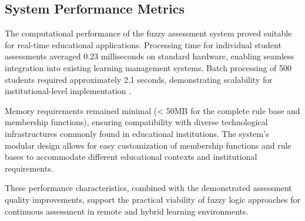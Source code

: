\subsection{System Performance Metrics}

The computational performance of the fuzzy assessment system proved suitable for real-time educational applications. Processing time for individual student assessments averaged 0.23 milliseconds on standard hardware, enabling seamless integration into existing learning management systems. Batch processing of 500 students required approximately 2.1 seconds, demonstrating scalability for institutional-level implementation \cite{Garcia2024}.

Memory requirements remained minimal (< 50MB for the complete rule base and membership functions), ensuring compatibility with diverse technological infrastructures commonly found in educational institutions. The system's modular design allows for easy customization of membership functions and rule bases to accommodate different educational contexts and institutional requirements.

These performance characteristics, combined with the demonstrated assessment quality improvements, support the practical viability of fuzzy logic approaches for continuous assessment in remote and hybrid learning environments.
